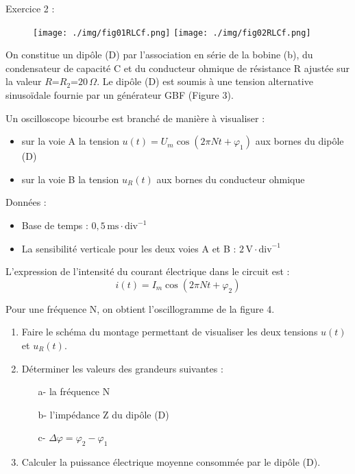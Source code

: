 \documentclass[12pt, french]{article}
\begin{document}
\begin{Box2}{Exercice 2 :  }
   \begin{wrapfigure}[10]{r}{0.4\textwidth}
  \begin{center}
	  \vspace{-0.8cm}
	\texttt{[image: ./img/fig01RLCf.png]}
	\texttt{[image: ./img/fig02RLCf.png]}
  \end{center}
\end{wrapfigure}

On constitue un dipôle (D) par l'association en série de la bobine (b), du condensateur de capacité C et du conducteur ohmique de résistance R ajustée sur la valeur $R $=$ R_2 $=$ 20\,\Omega$. Le dipôle (D) est soumis à une tension alternative sinusoïdale fournie par un générateur GBF (Figure 3).

Un oscilloscope bicourbe est branché de manière à visualiser :
\begin{itemize}
    \item sur la voie A la tension $u(t) = U_m\cos(2\pi N t + \varphi_1)$ aux bornes du dipôle (D)
    \item sur la voie B la tension $u_R(t)$ aux bornes du conducteur ohmique
\end{itemize}

Données :
\begin{itemize}
    \item Base de temps : $0,5\,\text{ms}\cdot\text{div}^{-1}$
    \item La sensibilité verticale pour les deux voies A et B : $2\,\text{V}\cdot\text{div}^{-1}$
\end{itemize}

L'expression de l'intensité du courant électrique dans le circuit est :
\[ i(t) = I_m\cos(2\pi N t + \varphi_2) \]

Pour une fréquence N, on obtient l'oscillogramme de la figure 4.

\begin{enumerate}
    \item Faire le schéma du montage permettant de visualiser les deux tensions $u(t)$ et $u_{R}(t)$. 
    
    \item Déterminer les valeurs des grandeurs suivantes :
    \begin{enumerate}
      \item[a-] la fréquence N
      \item[b-] l'impédance Z du dipôle (D)
      \item[c-] $\Delta \varphi = \varphi_2 - \varphi_1$
    \end{enumerate}
    
    \item Calculer la puissance électrique moyenne consommée par le dipôle (D).
\end{enumerate}
\end{Box2}
\end{document}
